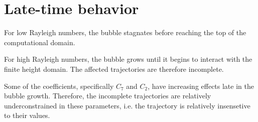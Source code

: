 \section{Late-time behavior}

For low Rayleigh numbers, the bubble stagnates before reaching the top of the computational domain.

For high Rayleigh numbers, the bubble grows until it begins to interact with the finite height domain.
The affected trajectories are therefore incomplete.

Some of the coefficients, specifically $C_7$ and $C_2$, have increasing effects late in the bubble growth.
Therefore, the incomplete trajectories are relatively underconstrained in these parameters, i.e. the trajectory is relatively insensetive to their values.


